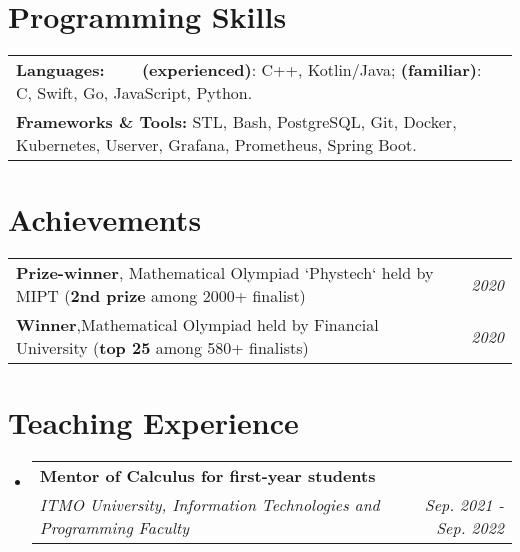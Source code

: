 \documentclass[letterpaper,10pt]{article}
\makeatletter
\newcommand{\resumeSubheading}[4]{
    \vspace{-1pt}\item
        \begin{tabular*}{0.97\textwidth}{l@{\extracolsep{\fill}}r}
            \textbf{#3} & \textcolor{mygray}{#2} \\
            \textit{\small#1} & \textcolor{mygray}{\textit{\small #4}} \\
        \end{tabular*}\vspace{-5pt}
}
\newcommand{\resumeSubHeadingListStart}{\begin{itemize}[leftmargin=*]}
\newcommand{\resumeSubHeadingListEnd}{\end{itemize}}
\makeatother
\begin{document}
\vspace{-1pt}

\section{Programming Skills}
    \resumeSubHeadingListStart
        \begin{tabular}{ll}
            \textbf{Languages:} \qquad\qquad\,\,\,\,\,\,\,\,\,\, \textbf{(experienced)}: C++, Kotlin/Java; \textbf{(familiar)}: C, Swift, Go, JavaScript, Python. \\
            \textbf{Frameworks \& Tools:} \quad STL, Bash, PostgreSQL, Git, Docker, Kubernetes, Userver, Grafana, Prometheus, Spring Boot.
        \end{tabular}
    \resumeSubHeadingListEnd


\vspace{-1pt}

\section{Achievements}
    \resumeSubHeadingListStart
        \begin{tabular}{ll}
            \textbf{Prize-winner}, \quad Mathematical Olympiad `Phystech` held by MIPT (\textbf{2nd prize} among 2000+ finalist) & \quad\quad\quad\quad\quad\quad\quad\quad \textit{\small 2020}\\
            \textbf{Winner},\quad\quad\quad\quad Mathematical Olympiad held by Financial University (\textbf{top 25} among 580+ finalists) & \quad\quad\quad\quad\quad\quad\quad\quad \textit{\small 2020} 
        \end{tabular}
    \resumeSubHeadingListEnd


\vspace{0.005pt}
\vspace{-1pt}

\section{Teaching Experience}
    \resumeSubHeadingListStart
        \resumeSubheading
            {ITMO University, Information Technologies and Programming Faculty}{}
            {Mentor of \textbf{Calculus} for first-year students}{Sep. 2021 - Sep. 2022}
  \resumeSubHeadingListEnd
\end{document}

